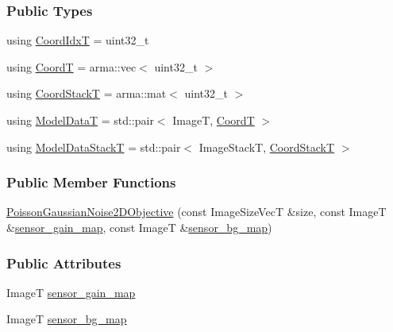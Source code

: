 \subsubsection*{Public Types}
\begin{DoxyCompactItemize}
\item 
using \hyperlink{classPoissonGaussianNoise2DObjective_a4167a20571c56d874f26f7432e5e3232}{Coord\+IdxT} = uint32\+\_\+t
\item 
using \hyperlink{classPoissonGaussianNoise2DObjective_a4869a86fc5712492b479c26b4d808e38}{CoordT} = arma\+::vec$<$ uint32\+\_\+t $>$
\item 
using \hyperlink{classPoissonGaussianNoise2DObjective_a5842f130c58c7f50fe2e44a76f6981a9}{Coord\+StackT} = arma\+::mat$<$ uint32\+\_\+t $>$
\item 
using \hyperlink{classPoissonGaussianNoise2DObjective_a9ee7fd979e5e5165304e224bff4d8754}{Model\+DataT} = std\+::pair$<$ ImageT, \hyperlink{classPoissonGaussianNoise2DObjective_a4869a86fc5712492b479c26b4d808e38}{CoordT} $>$
\item 
using \hyperlink{classPoissonGaussianNoise2DObjective_af88ce9c09fc860efefeba5569fbd5ac1}{Model\+Data\+StackT} = std\+::pair$<$ Image\+StackT, \hyperlink{classPoissonGaussianNoise2DObjective_a5842f130c58c7f50fe2e44a76f6981a9}{Coord\+StackT} $>$
\end{DoxyCompactItemize}
\subsubsection*{Public Member Functions}
\begin{DoxyCompactItemize}
\item 
\hyperlink{classPoissonGaussianNoise2DObjective_ac7f39bbac0ce14092aa82f59fd4b697a}{Poisson\+Gaussian\+Noise2\+D\+Objective} (const Image\+Size\+VecT \&size, const ImageT \&\hyperlink{classPoissonGaussianNoise2DObjective_aa28337c212470a6a5a152e691bcb7d45}{sensor\+\_\+gain\+\_\+map}, const ImageT \&\hyperlink{classPoissonGaussianNoise2DObjective_a84c763dc1db0d927cc1f8bcecdb3b663}{sensor\+\_\+bg\+\_\+map})
\end{DoxyCompactItemize}
\subsubsection*{Public Attributes}
\begin{DoxyCompactItemize}
\item 
ImageT \hyperlink{classPoissonGaussianNoise2DObjective_aa28337c212470a6a5a152e691bcb7d45}{sensor\+\_\+gain\+\_\+map}
\item 
ImageT \hyperlink{classPoissonGaussianNoise2DObjective_a84c763dc1db0d927cc1f8bcecdb3b663}{sensor\+\_\+bg\+\_\+map}
\end{DoxyCompactItemize}
